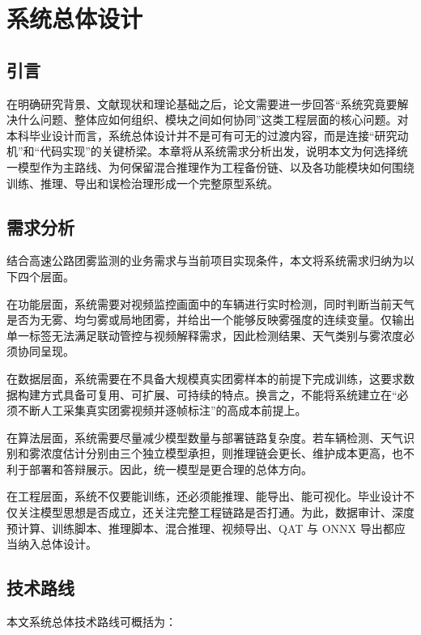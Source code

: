 \chapter{系统总体设计}

\section{引言}

在明确研究背景、文献现状和理论基础之后，论文需要进一步回答“系统究竟要解决什么问题、整体应如何组织、模块之间如何协同”这类工程层面的核心问题。对本科毕业设计而言，系统总体设计并不是可有可无的过渡内容，而是连接“研究动机”和“代码实现”的关键桥梁。本章将从系统需求分析出发，说明本文为何选择统一模型作为主路线、为何保留混合推理作为工程备份链、以及各功能模块如何围绕训练、推理、导出和误检治理形成一个完整原型系统。

\section{需求分析}

结合高速公路团雾监测的业务需求与当前项目实现条件，本文将系统需求归纳为以下四个层面。

在功能层面，系统需要对视频监控画面中的车辆进行实时检测，同时判断当前天气是否为无雾、均匀雾或局地团雾，并给出一个能够反映雾强度的连续变量。仅输出单一标签无法满足联动管控与视频解释需求，因此检测结果、天气类别与雾浓度必须协同呈现\cite{qx7292024,qx8082025,sunxiao2024}。

在数据层面，系统需要在不具备大规模真实团雾样本的前提下完成训练，这要求数据构建方式具备可复用、可扩展、可持续的特点。换言之，不能将系统建立在“必须不断人工采集真实团雾视频并逐帧标注”的高成本前提上。

在算法层面，系统需要尽量减少模型数量与部署链路复杂度。若车辆检测、天气识别和雾浓度估计分别由三个独立模型承担，则推理链会更长、维护成本更高，也不利于部署和答辩展示。因此，统一模型是更合理的总体方向。

在工程层面，系统不仅要能训练，还必须能推理、能导出、能可视化。毕业设计不仅关注模型思想是否成立，还关注完整工程链路是否打通。为此，数据审计、深度预计算、训练脚本、推理脚本、混合推理、视频导出、QAT 与 ONNX 导出都应当纳入总体设计。

\section{技术路线}

本文系统总体技术路线可概括为：

